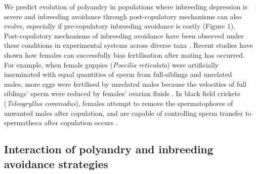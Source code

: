 \documentclass[12pt]{article}
\begin{document}
We predict evolution of polyandry in populations where inbreeding depression is severe and inbreeding avoidance through post-copulatory mechanisms can also evolve, especially if pre-copulatory inbreeding avoidance is costly (Figure 1). Post-copulatory mechanisms of inbreeding avoidance have been observed under these conditions in experimental systems across diverse taxa \cite[e.g.,][]{Pizzari2004, Firman2008, Bretman2009, Gasparini2011, Tuni2013, Firman2015}. Recent studies have shown how females can successfully bias fertilisation after mating has occurred. For example, when female guppies (\textit{Poecilia reticulata}) were artificially inseminated with equal quantities of sperm from full-siblings and unrelated males, more eggs were fertilised by unrelated males because the velocities of full siblings' sperm were reduced by females' ovarian fluids \cite[][]{Gasparini2011}. In black field crickets (\textit{Teleogryllus commodus}), females attempt to remove the spermatophores of unwanted males after copulation, and are capable of controlling sperm transfer to spermatheca after copulation occurs \cite[][]{Bussiere2006, Tuni2013}.

\subsection*{Interaction of polyandry and inbreeding avoidance strategies}
\end{document}
